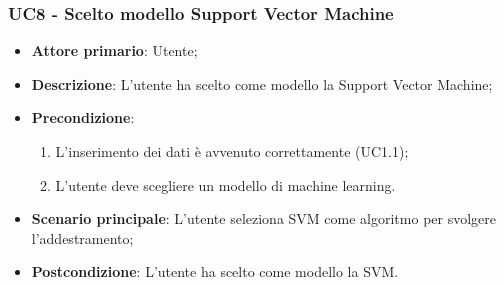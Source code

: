 \subsubsection{UC8 - Scelto modello Support Vector Machine}%
\label{sssec:uc8}
\begin{itemize}
  \item \textbf{Attore primario}: Utente;
  \item \textbf{Descrizione}: L'utente ha scelto come modello la Support Vector Machine;
  \item \textbf{Precondizione}:
  \begin{enumerate}
    \item L'inserimento dei dati è avvenuto correttamente (UC1.1);
    \item L'utente deve scegliere un modello di machine learning.
  \end{enumerate}
  \item \textbf{Scenario principale}: L'utente seleziona SVM come algoritmo per svolgere l'addestramento;
  \item \textbf{Postcondizione}: L'utente ha scelto come modello la SVM.
\end{itemize}
